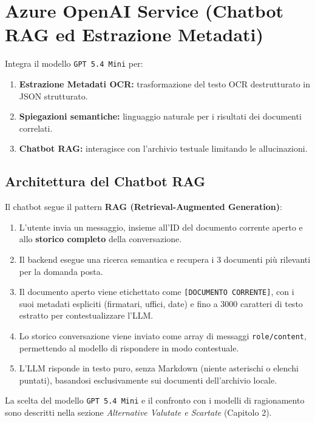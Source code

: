 \documentclass[12pt,a4paper,oneside]{report}
\begin{document}
\section{Azure OpenAI Service (Chatbot RAG ed Estrazione Metadati)}

Integra il modello \texttt{GPT 5.4 Mini} per:
\begin{enumerate}
    \item \textbf{Estrazione Metadati OCR:} trasformazione del testo OCR destrutturato in JSON strutturato.
    \item \textbf{Spiegazioni semantiche:} linguaggio naturale per i risultati dei documenti correlati.
    \item \textbf{Chatbot RAG:} interagisce con l'archivio testuale limitando le allucinazioni.
\end{enumerate}

\subsection{Architettura del Chatbot RAG}

Il chatbot segue il pattern \textbf{RAG (Retrieval-Augmented Generation)}:
\begin{enumerate}
    \item L'utente invia un messaggio, insieme all'ID del documento corrente aperto
          e allo \textbf{storico completo} della conversazione.
    \item Il backend esegue una ricerca semantica e recupera i 3 documenti pi\`{u}
          rilevanti per la domanda posta.
    \item Il documento aperto viene etichettato come \texttt{[DOCUMENTO CORRENTE]},
          con i suoi metadati espliciti (firmatari, uffici, date) e fino a 3000 caratteri
          di testo estratto per contestualizzare l'LLM.
    \item Lo storico conversazione viene inviato come array di messaggi \texttt{role/content},
          permettendo al modello di rispondere in modo contestuale.
    \item L'LLM risponde in testo puro, senza Markdown (niente asterischi o elenchi puntati),
          basandosi esclusivamente sui documenti dell'archivio locale.
\end{enumerate}

La scelta del modello \texttt{GPT 5.4 Mini} e il confronto con i modelli di ragionamento
sono descritti nella sezione \textit{Alternative Valutate e Scartate} (Capitolo 2).
\end{document}
